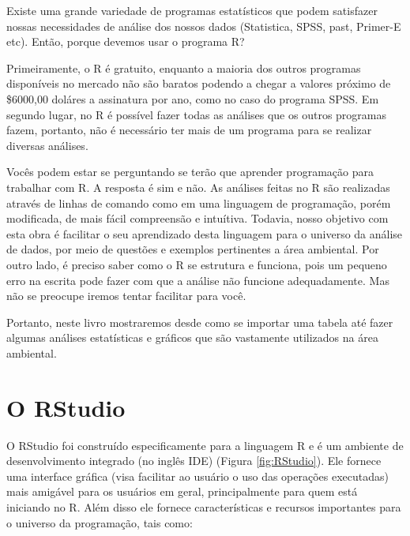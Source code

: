 \documentclass[14pt,titlepage, oneside, openany, a4paper]{book}
\begin{document}
Existe uma grande variedade de programas estatísticos que podem satisfazer nossas necessidades de análise dos nossos dados (Statistica, SPSS, past, Primer-E etc). Então, porque devemos usar o programa R?

Primeiramente, o R é gratuito, enquanto a maioria dos outros programas disponíveis no mercado não são baratos podendo a chegar a valores próximo de \$6000,00 doláres a assinatura por ano, como no caso do programa SPSS. Em segundo lugar, no R é possível fazer todas as análises que os outros programas fazem, portanto, não é necessário ter mais de um programa para se realizar diversas análises.

Vocês podem estar se perguntando se terão que aprender programação para trabalhar com R. A resposta é sim e não. As análises feitas no R são realizadas através de linhas de comando como em uma linguagem de programação, porém modificada, de mais fácil compreensão e intuítiva. Todavia, nosso objetivo com esta obra é facilitar o seu aprendizado desta linguagem para o universo da análise de dados, por meio de questões e exemplos pertinentes a área ambiental. Por outro lado, é preciso saber como o R se estrutura e funciona, pois um pequeno erro na escrita pode fazer com que a análise não funcione adequadamente. Mas não se preocupe iremos tentar facilitar para você.

Portanto, neste livro mostraremos desde como se importar uma tabela até fazer algumas análises estatísticas e gráficos que são vastamente utilizados na área ambiental.

\hypertarget{o-rstudio}{%
\section{O RStudio}\label{o-rstudio}}

O RStudio foi construído especificamente para a linguagem R e é um ambiente de desenvolvimento integrado (no inglês IDE) (Figura \ref{fig:RStudio}). Ele fornece uma interface gráfica (visa facilitar ao usuário o uso das operações executadas) mais amigável para os usuários em geral, principalmente para quem está iniciando no R. Além disso ele fornece características e recursos importantes para o universo da programação, tais como:
\end{document}
